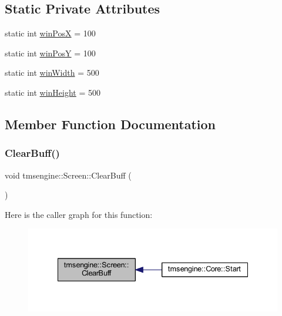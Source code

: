 \subsection*{Static Private Attributes}
\begin{DoxyCompactItemize}
\item 
static int \hyperlink{classtmsengine_1_1_screen_afa7a1938c25c1e724b698a9aa6dcc9b1}{win\+PosX} = 100
\item 
static int \hyperlink{classtmsengine_1_1_screen_aafa7ecb9c6daa3733662228ed92d388e}{win\+PosY} = 100
\item 
static int \hyperlink{classtmsengine_1_1_screen_a2ed0e8d3a57009e961f391b2b4993b3b}{win\+Width} = 500
\item 
static int \hyperlink{classtmsengine_1_1_screen_a3a62139bebecea188873b9b30122a6ec}{win\+Height} = 500
\end{DoxyCompactItemize}


\subsection{Member Function Documentation}
\mbox{\label{classtmsengine_1_1_screen_ab662ffd34dd93ef78adc63a3bfc6db18}} 
\subsubsection{\texorpdfstring{Clear\+Buff()}{ClearBuff()}}
{\footnotesize\ttfamily void tmsengine\+::\+Screen\+::\+Clear\+Buff (\begin{DoxyParamCaption}{ }\end{DoxyParamCaption})}

Here is the caller graph for this function\+:\nopagebreak
\begin{figure}[H]
\begin{center}
\leavevmode
\includegraphics[width=335pt]{classtmsengine_1_1_screen_ab662ffd34dd93ef78adc63a3bfc6db18_icgraph}
\end{center}
\end{figure}
\mbox{\label{classtmsengine_1_1_screen_a0192fc98efb3fb523858082312fbe1a7}} 
